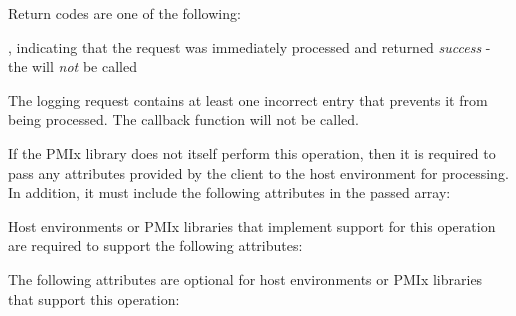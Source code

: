 \begin{arglist}
\end{arglist}

Return codes are one of the following:

\returnsimplenb

\returnstart
\begin{constantdesc}
\item {}, indicating that the request was immediately processed and returned \textit{success} - the  will \textit{not} be called
\item {} The logging request contains at least one incorrect entry that prevents it from being processed. The callback function will not be called.
\end{constantdesc}
\returnend

\reqattrstart
If the \ac{PMIx} library does not itself perform this operation, then it is required to pass any attributes provided by the client to the host environment for processing. In addition, it must include the following attributes in the passed  array:


Host environments or \ac{PMIx} libraries that implement support for this operation are required to support the following attributes:


\reqattrend

\optattrstart
The following attributes are optional for host environments or \ac{PMIx} libraries that support this operation:


